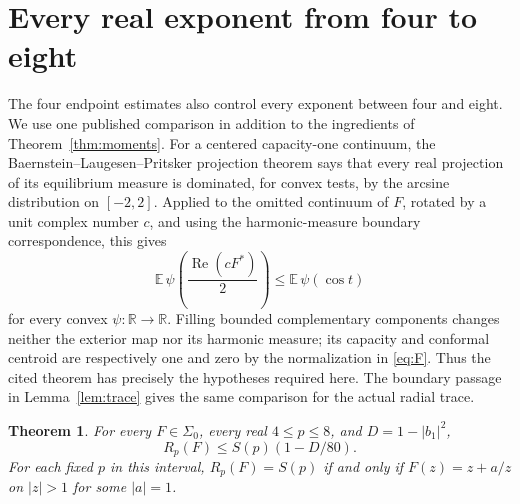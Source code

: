 \documentclass[11pt]{article}
\newtheorem{theorem}{Theorem}
\newcommand{\E}{\mathbb E}
\begin{document}
	\section{Every real exponent from four to eight}\label{sec:continuous-moments}
	The four endpoint estimates also control every exponent between four and
	eight.  We use one published comparison in addition to the ingredients of
	Theorem~\ref{thm:moments}.  For a centered capacity-one continuum, the
	Baernstein--Laugesen--Pritsker projection theorem
	\cite[Theorem~2]{BLP} says that every real projection of its equilibrium
	measure is dominated, for convex tests, by the arcsine distribution on
	$[-2,2]$.  Applied to the omitted continuum of $F$, rotated by a unit
	complex number $c$, and using the harmonic-measure boundary
	correspondence, this gives
	\begin{equation}\label{eq:projection-order}
		\E\,\psi\!\left(\frac{\operatorname{Re}(cF^*)}{2}\right)
		\le \E\,\psi(\cos t)
	\end{equation}
	for every convex $\psi:\mathbb R\to\mathbb R$. Filling bounded complementary
	components changes neither the exterior map nor its harmonic measure;
	its capacity and conformal centroid are respectively one and zero by
	the normalization in \eqref{eq:F}.  Thus the cited theorem has precisely
	the hypotheses required here.  The boundary passage in
	Lemma~\ref{lem:trace} gives the same comparison for the actual radial
	trace.
	
	\begin{theorem}\label{thm:radial-continuous}
		For every $F\in\Sigma_0$, every real $4\le p\le8$, and
		$D=1-|b_1|^2$,
		\begin{equation}\label{eq:continuous-deficit}
			R_p(F)\le S(p)(1-D/80).
		\end{equation}
		For each fixed $p$ in this interval,
		$R_p(F)=S(p)$ if and only if $F(z)=z+a/z$ on $|z|>1$ for some $|a|=1$.
	\end{theorem}
	
\end{document}

